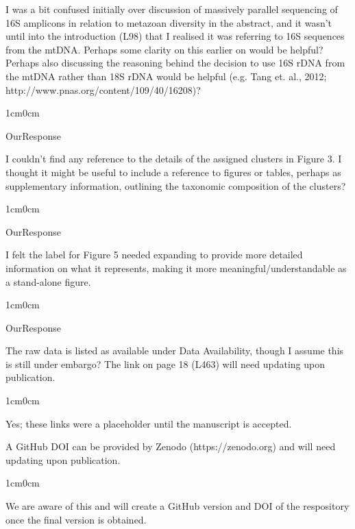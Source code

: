 \documentclass{article}
\newenvironment{response}
	{
	\begin{adjustwidth}{1cm}{0cm}
	\color{peerjBlue}
	}
	{
	\end{adjustwidth}
	}
\begin{document}
I was a bit confused initially over discussion of massively parallel sequencing of 16S amplicons in relation to metazoan diversity in the abstract, and it wasn’t until into the introduction (L98) that I realised it was referring to 16S sequences from the mtDNA. Perhaps some clarity on this earlier on would be helpful? Perhaps also discussing the reasoning behind the decision to use 16S rDNA from the mtDNA rather than 18S rDNA would be helpful (e.g. Tang et. al., 2012; http://www.pnas.org/content/109/40/16208)?
\begin{response}
  OurResponse\\
\end{response}

I couldn’t find any reference to the details of the assigned clusters in Figure 3. I thought it might be useful to include a reference to figures or tables, perhaps as supplementary information, outlining the taxonomic composition of the clusters?
\begin{response}
  OurResponse\\
\end{response}

I felt the label for Figure 5 needed expanding to provide more detailed information on what it represents, making it more meaningful/understandable as a stand-alone figure.
\begin{response}
  OurResponse\\
\end{response}

The raw data is listed as available under Data Availability, though I assume this is still under embargo? The link on page 18 (L463) will need updating upon publication.
\begin{response}
  Yes; these links were a placeholder until the manuscript is accepted.\\
\end{response}

A GitHub DOI can be provided by Zenodo (https://zenodo.org) and will need updating upon publication.
\begin{response}
  We are aware of this and will create a GitHub version and DOI of the respository once the final version is obtained.\\
\end{response}
\end{document}

